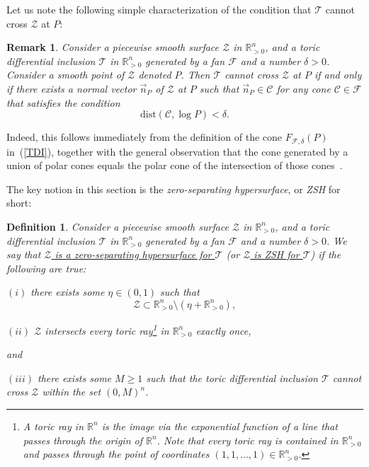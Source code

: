 \documentclass[12pt,letterpaper]{article}
\newtheorem{defn}[thm]{Definition}
\newtheorem{rem}[thm]{Remark}
\newcommand{\C}{\mathcal{C}}
\newcommand{\T}{\mathcal{T}}
\newcommand{\F}{\mathcal{F}}
\newcommand{\Z}{\mathcal{Z}}
\newcommand{\RR}{\mathbb{R}}
\newcommand{\RRn}{\mathbb{R}^n}
\newcommand{\RRp}{\mathbb{R}_{>0}}
\newcommand{\RRpn}{\mathbb{R}_{>0}^n}
\newcommand{\dist}{\mathrm{dist}}
\begin{document}
Let us note the following simple characterization of the condition that $\T$ cannot cross $\Z$ at $P$:


\begin{rem}
\label{rem:T_cannot_cross_S}
Consider a piecewise smooth surface $\Z$ in $\RRp^n$, and a toric differential inclusion $\T$ in $\RRp^n$ generated by a fan $\F$ and a number $\delta>0$. Consider a smooth point of $\Z$ denoted  $P$. Then $\T$ cannot cross $\Z$ at $P$ if and only if there exists a normal vector $\vec{n}_P$ of $\Z$ at $P$ such that $\vec{n}_P \in \C$ for any cone $\C \in \F$ that satisfies 
the condition
$$
\dist(\C, \log P) < \delta.
$$
\end{rem}

Indeed, this follows immediately from the definition of the cone $F_{\F, \delta}(P)$ in~(\ref{TDI}), together with the general observation that the cone generated by a union of polar cones equals the polar cone of the intersection of those cones~\cite{Rockafellar_Convex_Analysis}.

\bigskip

The key notion in this section is the {\em zero-separating hypersurface}, or {\em ZSH} for short:

\begin{defn}
Consider a piecewise smooth surface $\Z$ in $\RRp^n$, and a toric differential inclusion $\T$ in $\RRp^n$ generated by a fan $\F$ and a number $\delta>0$. 
We say that \underline{$\Z$ is a zero-separating hypersurface for $\T$} (or \underline{$\Z$ is ZSH for $\T$}) if the following are true:

$(i)$ there exists some $\eta \in (0,1)$ such that 
$$
\Z \subset \RRp^n \setminus (\eta + \RRp^n),
$$

$(ii)$ $\Z$ intersects every toric ray\footnote{A {\em toric ray} in $\RRn$ is the image via the exponential function of a line that passes through the origin of $\RR^n$. Note that every toric ray is contained in $\RRp^n$ and passes through the point of coordinates $(1,1, \dots, 1) \in \RRpn$.} in $\RRp^n$ exactly once,

\noindent
and

$(iii)$ there exists some $M \ge 1$ such that the toric differential inclusion $\T$ cannot cross $\Z$ within the set $(0,M)^n$. 
\end{defn}
\end{document}
